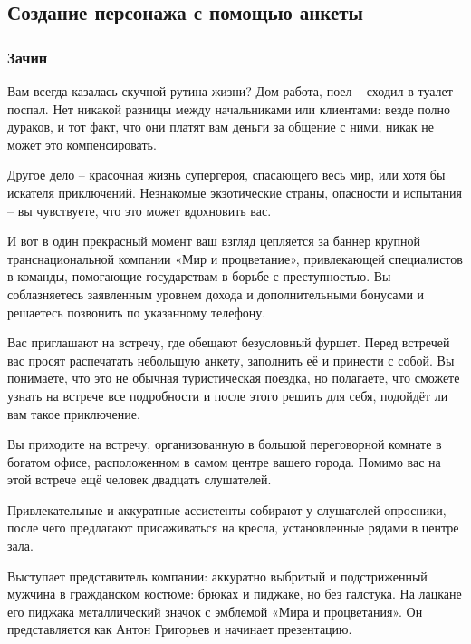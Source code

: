 \documentclass[
]{article}
\begin{document}
\subsection{Создание персонажа с помощью
анкеты}\label{ux441ux43eux437ux434ux430ux43dux438ux435-ux43fux435ux440ux441ux43eux43dux430ux436ux430-ux441-ux43fux43eux43cux43eux449ux44cux44e-ux430ux43dux43aux435ux442ux44b}

\subsubsection{Зачин}\label{ux437ux430ux447ux438ux43d}

Вам всегда казалась скучной рутина жизни? Дом-работа, поел -- сходил в
туалет -- поспал. Нет никакой разницы между начальниками или клиентами:
везде полно дураков, и тот факт, что они платят вам деньги за общение с
ними, никак не может это компенсировать.

Другое дело -- красочная жизнь супергероя, спасающего весь мир, или хотя
бы искателя приключений. Незнакомые экзотические страны, опасности и
испытания -- вы чувствуете, что это может вдохновить вас.

И вот в один прекрасный момент ваш взгляд цепляется за баннер крупной
транснациональной компании «Мир и процветание», привлекающей
специалистов в команды, помогающие государствам в борьбе с
преступностью. Вы соблазняетесь заявленным уровнем дохода и
дополнительными бонусами и решаетесь позвонить по указанному телефону.

Вас приглашают на встречу, где обещают безусловный фуршет. Перед
встречей вас просят распечатать небольшую анкету, заполнить её и
принести с собой. Вы понимаете, что это не обычная туристическая
поездка, но полагаете, что сможете узнать на встрече все подробности и
после этого решить для себя, подойдёт ли вам такое приключение.

Вы приходите на встречу, организованную в большой переговорной комнате в
богатом офисе, расположенном в самом центре вашего города. Помимо вас на
этой встрече ещё человек двадцать слушателей.

Привлекательные и аккуратные ассистенты собирают у слушателей опросники,
после чего предлагают присаживаться на кресла, установленные рядами в
центре зала.

Выступает представитель компании: аккуратно выбритый и подстриженный
мужчина в гражданском костюме: брюках и пиджаке, но без галстука. На
лацкане его пиджака металлический значок с эмблемой «Мира и
процветания». Он представляется как Антон Григорьев и начинает
презентацию.
\end{document}
